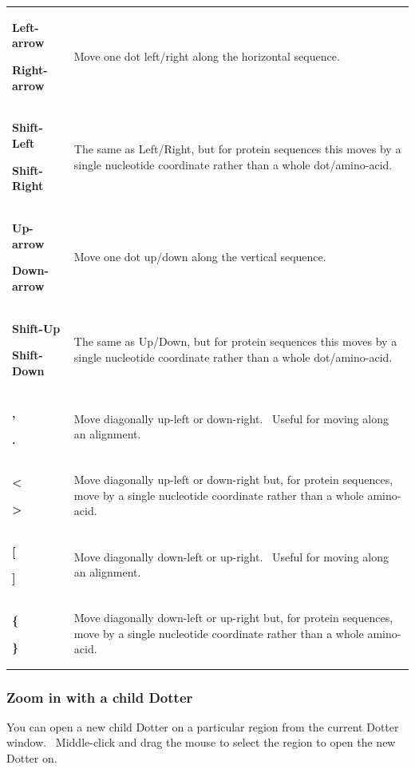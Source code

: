 \documentclass{report}
\begin{document}
\begin{center}
\tablehead{}
\begin{supertabular}{p{2.802cm}p{10.704cm}}
{\bfseries Left-arrow}

\bfseries Right-arrow &
 Move one dot left/right along the horizontal
sequence.\\
{\bfseries Shift-Left}

\bfseries Shift-Right &
 The same as Left/Right, but for protein
sequences this moves by a single nucleotide coordinate rather than a
whole dot/amino-acid.\\
{\bfseries Up-arrow}

\bfseries Down-arrow &
 Move one dot up/down along the vertical
sequence.\\
{\bfseries Shift-Up}

\bfseries Shift-Down &
 The same as Up/Down, but for protein sequences
this moves by a single nucleotide coordinate rather than a whole
dot/amino-acid.\\
{\bfseries ,}

\bfseries . &
 Move diagonally up-left or down-right. \ Useful
for moving along an alignment.\\
{\bfseries {\textless}}

\bfseries {\textgreater} &
 Move diagonally up-left or down-right but, for
protein sequences, move by a single nucleotide coordinate rather than a
whole amino-acid.\\
{\bfseries [}

\bfseries ] &
 Move diagonally down-left or up-right. \ Useful
for moving along an alignment.\\
{\bfseries \{}

\bfseries \} &
 Move diagonally down-left or up-right but, for
protein sequences, move by a single nucleotide coordinate rather than a
whole amino-acid.\\
\end{supertabular}
\end{center}

{\color[rgb]{0.30980393,0.5058824,0.7411765}\subsubsection[Zoom in with a child Dotter]{Zoom in with a child Dotter}}
{You can open a new child Dotter on a particular region from the current
Dotter window. \ Middle-click and drag the mouse to select the region
to open the new Dotter on.}

\bigskip
\end{document}
